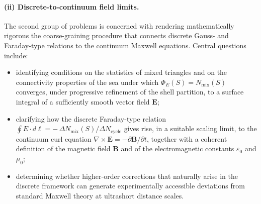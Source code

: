 \documentclass[11pt,a4paper]{article}
\begin{document}
\paragraph{(ii) Discrete-to-continuum field limits.}
The second group of problems is concerned with rendering mathematically rigorous the coarse-graining procedure that connects discrete Gauss- and Faraday-type relations to the continuum Maxwell equations. Central questions include:
\begin{itemize}
  \item identifying conditions on the statistics of mixed triangles and on the connectivity properties of the sea under which $\Phi_{E}(S)=N_{\mathrm{mix}}(S)$ converges, under progressive refinement of the shell partition, to a surface integral of a sufficiently smooth vector field $\mathbf{E}$;
  \item clarifying how the discrete Faraday-type relation $\oint E\cdot d\ell = -\,\Delta N_{\mathrm{mix}}(S)/\Delta N_{\mathrm{cycle}}$ gives rise, in a suitable scaling limit, to the continuum curl equation $\nabla\times\mathbf{E}=-\partial\mathbf{B}/\partial t$, together with a coherent definition of the magnetic field $\mathbf{B}$ and of the electromagnetic constants $\varepsilon_{0}$ and $\mu_{0}$;
  \item determining whether higher-order corrections that naturally arise in the discrete framework can generate experimentally accessible deviations from standard Maxwell theory at ultrashort distance scales.\cite{Laubscher2026TopologicalReformulation}
\end{itemize}
\end{document}
